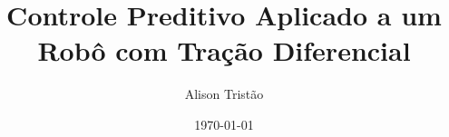 \documentclass[12pt]{article}
\begin{document}
\justifying

\title{Controle Preditivo Aplicado a um Robô com Tração Diferencial}
\author{Alison Tristão}
\date{\today}
\maketitle

\tableofcontents
\newpage

\justifying









\newpage


\end{document}
